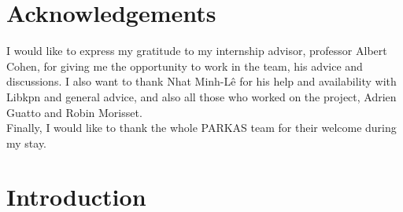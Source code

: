\documentclass[a4paper,11pt]{article}
\begin{document}
\clearpage
\newpage
\null\vspace{5cm}
\section*{Acknowledgements}
I would like to express my gratitude to my internship advisor, professor Albert Cohen,
for giving me the opportunity to work in the team, his advice and discussions. I also
want to thank Nhat Minh-L\^e for his help and availability with Libkpn and general advice,
and also all those who worked on the project, Adrien Guatto and Robin Morisset. \\
Finally, I would like to thank the whole PARKAS team for their welcome during my stay.

\clearpage
\newpage
\null
\vspace{5cm}
\begin{abstract}
The main purpose of this internship is to study and implement new applications in a complete 
runtime system for Kahn process networks, Libkpn, developed in the Inria/ENS PARKAS team. \\
The implementation of 1-d jacobi stencil application in the special case of small iteration numbers,
using a special tiling technique, shows better performance than implementations using the 
state-of-the-art OpenMP4 model for shared-memory concurrent programs. 
\end{abstract}
\newpage
{}
\tableofcontents
\newpage

\section{Introduction}
\end{document}
